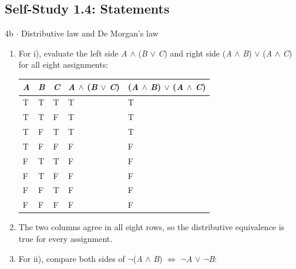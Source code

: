 \documentclass[11pt]{article}
\begin{document}
\begin{keepsection}\subsection{Self-Study 1.4: Statements}

\begin{workedbox}{4b \ensuremath{\cdot} Distributive law and De Morgan’s law}
\begin{enumerate}
\item {}
For i), evaluate the left side \textit{A} \ensuremath{\land} (\textit{B} \ensuremath{\lor} \textit{C}) and right side (\textit{A} \ensuremath{\land} \textit{B}) \ensuremath{\lor} (\textit{A} \ensuremath{\land} \textit{C}) for all eight assignments:

\begin{center}\small\begin{tabularx}{\linewidth}{>{\raggedright\arraybackslash}X>{\raggedright\arraybackslash}X>{\raggedright\arraybackslash}X>{\raggedright\arraybackslash}X>{\raggedright\arraybackslash}X}\toprule
\textbf{\textit{A}} & \textbf{\textit{B}} & \textbf{\textit{C}} & \textbf{\textit{A} \ensuremath{\land} (\textit{B} \ensuremath{\lor} \textit{C})} & \textbf{(\textit{A} \ensuremath{\land} \textit{B}) \ensuremath{\lor} (\textit{A} \ensuremath{\land} \textit{C})} \\ \midrule
T & T & T & T & T \\
T & T & F & T & T \\
T & F & T & T & T \\
T & F & F & F & F \\
F & T & T & F & F \\
F & T & F & F & F \\
F & F & T & F & F \\
F & F & F & F & F \\
\bottomrule\end{tabularx}\end{center}
\item The two columns agree in all eight rows, so the distributive equivalence is true for every assignment.
\item {}
For ii), compare both sides of \ensuremath{\neg}(\textit{A} \ensuremath{\land} \textit{B}) \ensuremath{\Leftrightarrow} \ensuremath{\neg}\textit{A} \ensuremath{\lor} \ensuremath{\neg}\textit{B}:


\end{enumerate}
\end{workedbox}
\end{keepsection}
\end{document}
